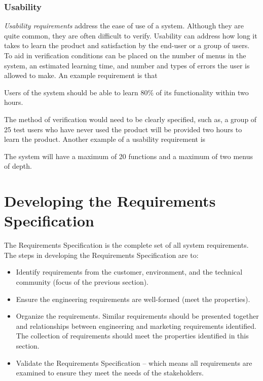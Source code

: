 \subsubsection*{Usability }
\label{subsection:usability}

\emph{Usability requirements} address the ease of use of a system.
Although they are quite common, they are often difficult to verify.
Usability can address how long it takes to learn the product and
satisfaction by the end-user or a group of users. To aid in verification
conditions can be placed on the number of menus in the system, an
estimated learning time, and number and types of errors the user is
allowed to make. An example requirement is that

\begin{itquote}
Users of the system should be able to learn 80\% of its functionality
within two hours.
\end{itquote}

The method of verification would need to be clearly specified, such as,
a group of 25 test users who have never used the product will be
provided two hours to learn the product. Another example of a usability
requirement is

\begin{itquote}
The system will have a maximum of 20 functions and a maximum of two
menus of depth.
\end{itquote}

\section{Developing the Requirements Specification}
\label{section:developing-the-requirements-specification}

The Requirements Specification is the complete set of all system
requirements. The steps in developing the Requirements Specification are
to:

\begin{itemize}
\item
  Identify requirements from the customer, environment, and the
  technical community (focus of the previous section).
\item
  Ensure the engineering requirements are well-formed (meet the
  properties).
\item
  Organize the requirements. Similar requirements should be presented
  together and relationships between engineering and marketing
  requirements identified. The collection of requirements should meet
  the properties identified in this section.
\item
  Validate the Requirements Specification -- which means all
  requirements are examined to ensure they meet the needs of the
  stakeholders.
\end{itemize}

